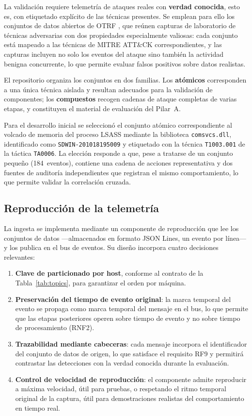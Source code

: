 La validación requiere telemetría de ataques reales con \textbf{verdad conocida}, esto es,
con etiquetado explícito de las técnicas presentes. Se emplean para ello los conjuntos de
datos abiertos de OTRF \cite{otrf}, que reúnen capturas de laboratorio de técnicas
adversarias con dos propiedades especialmente valiosas: cada conjunto está mapeado a las
técnicas de MITRE ATT\&CK correspondientes, y las capturas incluyen no solo los eventos del
ataque sino también la actividad benigna concurrente, lo que permite evaluar falsos
positivos sobre datos realistas.

El repositorio organiza los conjuntos en dos familias. Los \textbf{atómicos} corresponden a
una única técnica aislada y resultan adecuados para la validación de componentes; los
\textbf{compuestos} recogen cadenas de ataque completas de varias etapas, y constituyen el
material de evaluación del Pilar~A.

Para el desarrollo inicial se seleccionó el conjunto atómico correspondiente al volcado de
memoria del proceso LSASS mediante la biblioteca \texttt{comsvcs.dll}, identificado como
\texttt{SDWIN-201018195009} y etiquetado con la técnica \texttt{T1003.001} de la táctica
\texttt{TA0006}. La elección responde a que, pese a tratarse de un conjunto pequeño
(184~eventos), contiene una cadena de acciones representativa y dos fuentes de auditoría
independientes que registran el mismo comportamiento, lo que permite validar la correlación
cruzada.

\subsection{Reproducción de la telemetría}

La ingesta se implementa mediante un componente de reproducción que lee los conjuntos de
datos —almacenados en formato JSON Lines, un evento por línea— y los publica en el bus de
eventos. Su diseño incorpora cuatro decisiones relevantes:

\begin{enumerate}
    \item \textbf{Clave de particionado por host}, conforme al contrato de la
    Tabla~\ref{tab:topics}, para garantizar el orden por máquina.
    \item \textbf{Preservación del tiempo de evento original}: la marca temporal del evento
    se propaga como marca temporal del mensaje en el bus, lo que permite que las etapas
    posteriores operen sobre tiempo de evento y no sobre tiempo de procesamiento (RNF2).
    \item \textbf{Trazabilidad mediante cabeceras}: cada mensaje incorpora el identificador
    del conjunto de datos de origen, lo que satisface el requisito RF9 y permitirá contrastar
    las detecciones con la verdad conocida durante la evaluación.
    \item \textbf{Control de velocidad de reproducción}: el componente admite reproducir a
    máxima velocidad, útil para pruebas, o respetando el ritmo temporal original de la
    captura, útil para demostraciones realistas del comportamiento en tiempo real.
\end{enumerate}

